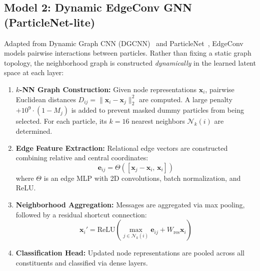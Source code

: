 \documentclass[10pt,twocolumn,letterpaper]{article}
\begin{document}
\subsection{Model 2: Dynamic EdgeConv GNN (ParticleNet-lite)}
Adapted from Dynamic Graph CNN (DGCNN)~\cite{wang2019dgcnn} and ParticleNet~\cite{qu2020particlenet}, EdgeConv models pairwise interactions between particles. Rather than fixing a static graph topology, the neighborhood graph is constructed \emph{dynamically} in the learned latent space at each layer:
\begin{enumerate}
    \item \textbf{$k$-NN Graph Construction:} Given node representations $\mathbf{x}_i$, pairwise Euclidean distances $D_{ij} = \|\mathbf{x}_i - \mathbf{x}_j\|_2^2$ are computed. A large penalty $+10^9 \cdot (1 - M_j)$ is added to prevent masked dummy particles from being selected. For each particle, its $k=16$ nearest neighbors $\mathcal{N}_k(i)$ are determined.
    \item \textbf{Edge Feature Extraction:} Relational edge vectors are constructed combining relative and central coordinates:
    \begin{equation}
        \mathbf{e}_{ij} = \Theta([\mathbf{x}_j - \mathbf{x}_i, \, \mathbf{x}_i])
    \end{equation}
    where $\Theta$ is an edge MLP with 2D convolutions, batch normalization, and ReLU.
    \item \textbf{Neighborhood Aggregation:} Messages are aggregated via max pooling, followed by a residual shortcut connection:
    \begin{equation}
        \mathbf{x}_i' = \text{ReLU}\left( \max_{j \in \mathcal{N}_k(i)} \mathbf{e}_{ij} + W_{\text{res}} \mathbf{x}_i \right)
    \end{equation}
    \item \textbf{Classification Head:} Updated node representations are pooled across all constituents and classified via dense layers.
\end{enumerate}
\end{document}
